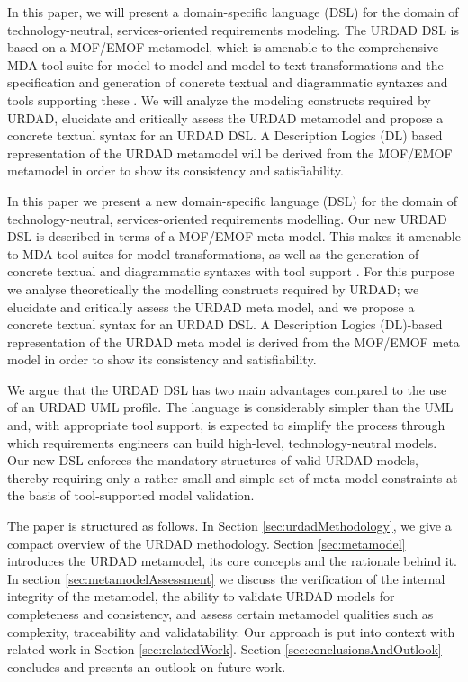 In this paper, we will present a domain-specific language (DSL) for the domain of technology-neutral, services-oriented requirements modeling. The URDAD DSL is based on a MOF/EMOF metamodel, which is amenable to the comprehensive MDA tool suite for model-to-model and model-to-text transformations and the specification and generation of concrete textual and diagrammatic syntaxes and tools supporting these \cite{gronback_model_2008}. We will analyze the modeling constructs required by URDAD, elucidate and critically assess the URDAD metamodel and propose a concrete textual syntax for an URDAD DSL. A Description Logics (DL) based representation of the URDAD metamodel will be derived from the MOF/EMOF metamodel in order to show its consistency and satisfiability.

In this paper we present a new domain-specific language (DSL) for the domain of technology-neutral, services-oriented 
requirements modelling. Our new URDAD DSL is described in terms of a MOF/EMOF meta model. This makes it amenable to MDA tool 
suites for model transformations, as well as the generation of concrete textual and diagrammatic syntaxes with 
tool support \cite{gronback_model_2008}. For this purpose we analyse theoretically the modelling constructs required 
by URDAD; we elucidate and critically assess the URDAD meta model, and we propose a concrete textual syntax for an URDAD 
DSL. A Description Logics (DL)-based representation of the URDAD meta model is derived from the MOF/EMOF meta model 
in order to show its consistency and satisfiability.

We argue that the URDAD DSL has two main advantages compared to the use of an URDAD UML profile. The language is considerably simpler than the UML and, with appropriate tool support, is expected to simplify the process through which requirements engineers can build high-level, technology-neutral models. Our new DSL enforces the mandatory structures of valid URDAD models, thereby requiring only a rather small and simple set of meta model constraints at the basis of tool-supported model validation. 

The paper is structured as follows. In Section \ref{sec:urdadMethodology}, we give a compact overview of the URDAD methodology. Section \ref{sec:metamodel} introduces the URDAD metamodel, its core concepts and the rationale behind it. In section \ref{sec:metamodelAssessment} we discuss the verification of the internal integrity of the metamodel, the ability to validate URDAD models for completeness and consistency, and assess certain metamodel qualities such as complexity, traceability and validatability. Our approach is put into context with related work in Section \ref{sec:relatedWork}. Section \ref{sec:conclusionsAndOutlook} concludes and presents an outlook on future work.
